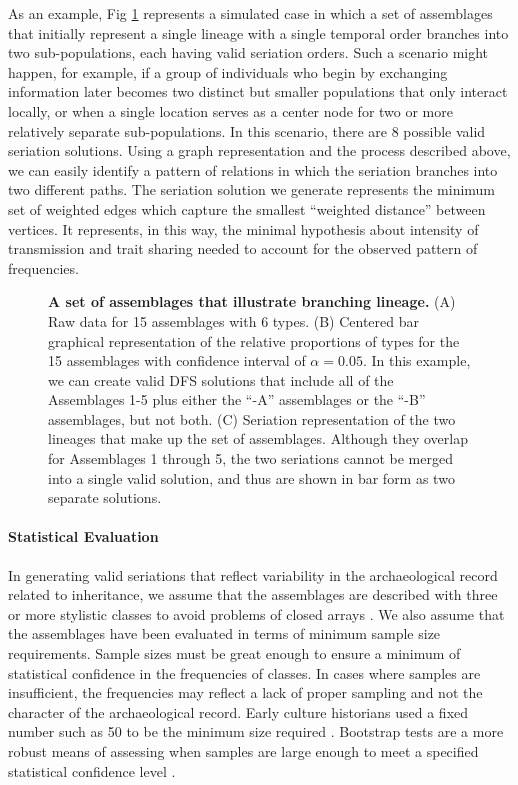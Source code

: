 \documentclass[10pt,letterpaper]{article}
\begin{document}
As an example, Fig \ref{fig7} represents a simulated case in which a set of assemblages that initially represent a single lineage with a single temporal order branches into two sub-populations, each having valid seriation orders. Such a scenario might happen, for example, if a group of individuals who begin by exchanging information later becomes two distinct but smaller populations that only interact locally, or when a single location serves as a center node for two or more relatively separate sub-populations. In this scenario, there are 8 possible valid seriation solutions. Using a graph representation and the process described above, we can easily identify a pattern of relations in which the seriation branches into two different paths.  The seriation solution we generate represents the minimum set of weighted edges which capture the smallest “weighted distance” between vertices. It represents, in this way, the minimal hypothesis about intensity of transmission and trait sharing needed to account for the observed pattern of frequencies. 

\begin{figure}[h]
\caption{{\bf A set of assemblages that illustrate branching lineage.} (A) Raw data for 15 assemblages with 6 types. (B) Centered bar graphical representation of the relative proportions of types for the 15 assemblages with confidence interval of $\alpha=0.05$. In this example, we can create valid DFS solutions that include all of the Assemblages 1-5 plus either the ``-A'' assemblages or the ``-B'' assemblages, but not both. (C) Seriation representation of the two lineages that make up the set of assemblages. Although they overlap for Assemblages 1 through 5, the two seriations cannot be merged into a single valid solution, and thus are shown in bar form as two separate solutions.}
\label{fig7}
\end{figure}

\paragraph{Statistical Evaluation}

In generating valid seriations that reflect variability in the archaeological record related to inheritance, we assume that the assemblages are described with three or more stylistic classes \cite{Dunnell1978,Lipo2001} to avoid problems of closed arrays \cite{lyman1997rise,Lyman:2006aa,McNutt1973,McNutt:2001aa,Spier1917a}. We also assume that the assemblages have been evaluated in terms of minimum sample size requirements. Sample sizes must be great enough to ensure a minimum of statistical confidence in the frequencies of classes. In cases where samples are insufficient, the frequencies may reflect a lack of proper sampling and not the character of the archaeological record. Early culture historians used a fixed number such as 50 to be the minimum size required \cite{Phillips1951}. Bootstrap tests are a more robust means of assessing when samples are large enough to meet a specified statistical confidence level \cite{Cochrane2003,Lipo1997Population}. 
\end{document}
